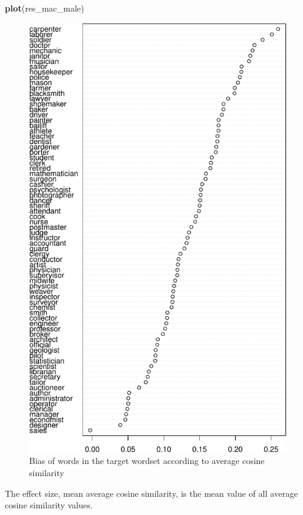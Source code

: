 \documentclass[english,man]{apa6}
\newenvironment{Shaded}{\begin{snugshade}}{\end{snugshade}}
\newcommand{\KeywordTok}[1]{\textcolor[rgb]{0.13,0.29,0.53}{\textbf{#1}}}
\newcommand{\NormalTok}[1]{#1}
\begin{document}
\begin{Shaded}
\begin{Highlighting}[]
\KeywordTok{plot}\NormalTok{(res_mac_male)}
\end{Highlighting}
\end{Shaded}

\begin{figure}
\centering
\includegraphics{ica_files/figure-latex/acs-1.pdf}
\caption{\label{fig:acs}Bias of words in the target wordset according to average cosine similarity}
\end{figure}

The effect size, mean average cosine similarity, is the mean value of all average cosine similarity values.
\end{document}
